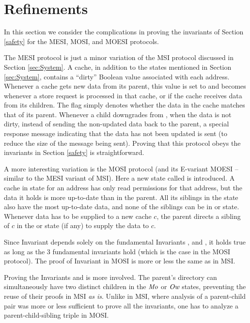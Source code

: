 \section{Refinements}
\label{sec:Refinements}

In this section we consider the complications in proving the invariants
of Section \ref{safety} for the MESI, MOSI, and MOESI protocols.

The MESI protocol is just a minor variation of the MSI protocol discussed in Section \ref{sec:System}.
A cache, in addition to the states mentioned in Section
\ref{sec:System}, contains a ``dirty'' Boolean value associated with each
address.  Whenever a cache gets new data from its parent, this value is set to
\False{} and becomes \True{} whenever a store request is processed in that
cache, or if the cache receives data from its children. The flag simply denotes
whether the data in the cache matches that of its parent.  Whenever a
child downgrades from \Mo{}, when the data is not dirty, instead of sending the
non-updated data back to the parent, a special response message indicating that
the data has not been updated is sent (to reduce the size of the message being
sent). Proving that this protocol obeys the invariants in Section \ref{safety}
is straightforward.

A more interesting variation is the MOSI protocol (and its E-variant MOESI --
similar to the MESI variant of MSI). Here a new state called \Ow{} is
introduced. A cache in \Ow{} state for an address has only read permissions for
that address, but the data it holds is more up-to-date than in the parent.  All
its siblings in the \Sh{} state also have the most up-to-date data, and none of
the siblings can be in \Mo{} or \Ow{} state.  Whenever data has to be supplied
to a new cache $c$, the parent directs a sibling of $c$ in the \Ow{} or \Mo{}
state (if any) to supply the data to $c$.

Since Invariant  depends solely on the fundamental Invariants
,  and , it holds true
as long as the 3 fundamental invariants hold (which is the case in the MOSI
protocol). The proof of Invariant  in MOSI is more
or less the same as in MSI.

Proving the Invariants  and
 is more involved. The parent's directory can
simultaneously have two distinct children in the $\textit{Mo}$ or $\textit{Ow}$ states,
preventing the reuse of their proofs in MSI \emph{as is}. Unlike in MSI, where
analysis of a parent-child pair was more or less sufficient to prove all the
invariants, one has to analyze a parent-child-sibling triple in MOSI.
